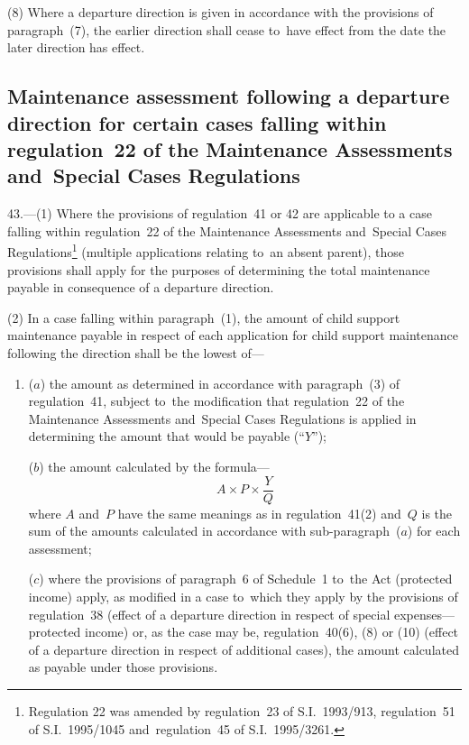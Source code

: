 \documentclass[12pt,a4paper]{article}
\begin{document}
(8) Where a departure direction is given in accordance with the provisions of paragraph~(7), the earlier direction shall cease to~have effect from the date the later direction has effect.


\subsection[43. Maintenance assessment following a departure direction for certain cases falling
within regulation~22 of the Maintenance Assessments and~Special Cases
Regulations]{Maintenance assessment following a departure direction for certain cases falling
within regulation~22 of the Maintenance Assessments and~Special Cases
Regulations}

43.—(1) Where the provisions of regulation~41 or 42 are applicable to
a case falling within regulation~22 of the Maintenance Assessments and~Special
Cases Regulations\footnote{\frenchspacing Regulation 22 was amended by regulation~23 of S.I.~1993/913, regulation~51 of S.I.~1995/1045 and~regulation~45 of S.I.~1995/3261.} (multiple applications relating to~an absent parent),
those provisions shall apply for the purposes of determining the total
maintenance payable in consequence of a departure direction.

(2) In a case falling within paragraph~(1), the amount of child support maintenance payable in respect of each application for child support maintenance following the direction shall be the 
lowest  %
of—
\begin{enumerate}\item[]
($a$) the amount as determined in accordance with paragraph~(3) of regulation~41,
subject to~the modification that regulation~22 of the Maintenance Assessments
and~Special Cases Regulations is applied in determining the amount that would be
payable (“$Y$”);

($b$) the amount calculated by the formula—
\[A \times P \times \frac{Y}{Q}\]
where $A$ and~$P$ have the same meanings as in regulation~41(2) and~$Q$ is the sum of
the amounts calculated in accordance with sub-paragraph~($a$) for each assessment;

($c$) where the provisions of paragraph~6 of Schedule~1 to~the Act (protected income) apply, as modified in a case to~which they apply by the provisions of regulation~38 (effect of a departure direction in respect of special expenses—protected income) or, as the case may be, regulation~40(6), (8) or (10) (effect of a departure direction in respect of additional cases), the amount calculated as payable under those provisions.
\end{enumerate}
\end{document}
